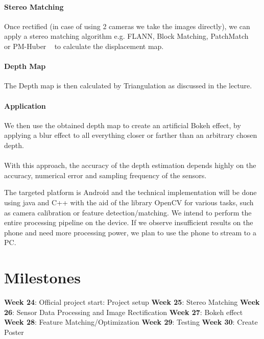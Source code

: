 \documentclass[a4paper,pagesize 10pt]{scrartcl}
\begin{document}
\paragraph{Stereo Matching}
Once rectified (in case of using 2 cameras we take the images directly), we can apply a stereo matching algorithm e.g. FLANN, Block Matching, PatchMatch ~\cite{Bleyer2011} or PM-Huber ~\cite{Heise2013} to calculate the displacement map. 
\paragraph{Depth Map}
The Depth map is then calculated by Triangulation as discussed in the lecture.
\paragraph{Application}
We then use the obtained depth map to create an artificial Bokeh effect, by applying a blur effect to all everything closer or farther than an arbitrary chosen depth.\\\\
With this approach, the accuracy of the depth estimation depends highly on the accuracy, numerical error and sampling frequency of the sensors.

The targeted platform is Android and the technical implementation will be done using java and C++ with the aid of the library OpenCV for various tasks, such as camera calibration or feature detection/matching. We intend to perform the entire processing pipeline on the device. If we observe insufficient results on the phone and need more processing power, we plan to use the phone to stream to a PC.

%
%
\section{Milestones}
\textbf{Week 24}: Official project start: Project setup\newline
\textbf{Week 25}: Stereo Matching\newline
\textbf{Week 26}: Sensor Data Processing and Image Rectification\newline
\textbf{Week 27}: Bokeh effect\newline
\textbf{Week 28}: Feature Matching/Optimization \newline
\textbf{Week 29}: Testing\newline
\textbf{Week 30}: Create Poster\newline
\end{document}
